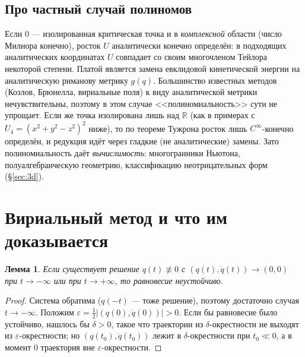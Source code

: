 \documentclass[11pt,a4paper]{article}
\newtheorem{lemma}[theorem]{Лемма}
\theoremstyle{definition}
\newcommand{\R}{\mathbb R}
\newcommand{\eps}{\varepsilon}
\begin{document}
\subsection{Про частный случай полиномов}\label{sec:poly}
Если $0$ --- изолированная критическая точка и в \emph{комплексной} области (число Милнора конечно),
росток $U$ аналитически конечно определён: в подходящих аналитических координатах $U$ совпадает со
своим многочленом Тейлора некоторой степени. Платой является замена евклидовой кинетической энергии
на аналитическую риманову метрику $g(q)$. Большинство известных методов (Козлов, Брюнелла,
вириальные поля) к виду аналитической метрики нечувствительны, поэтому в этом случае
<<полиномиальность>> сути не упрощает. Если же точка изолирована лишь над $\R$ (как в примерах
с $U_4=(x^2+y^2-z^2)^2$ ниже), то по теореме Тужрона росток лишь $C^\infty$-конечно определён,
и редукция идёт через гладкие (не аналитические) замены. Зато полиномиальность даёт
\emph{вычислимость}: многогранники Ньютона, полуалгебраическую геометрию, классификацию
неотрицательных форм (\S\ref{sec:3d}).

\section{Вириальный метод и что им доказывается}\label{sec:virial}

\begin{lemma}\label{lem:asympt}
Если существует решение $q(t)\not\equiv0$ с $(q(t),\dot q(t))\to(0,0)$ при $t\to-\infty$ или при
$t\to+\infty$, то равновесие неустойчиво.
\end{lemma}
\begin{proof}
Система обратима ($q(-t)$ --- тоже решение), поэтому достаточно случая $t\to-\infty$.
Положим $\eps=\frac12|(q(0),\dot q(0))|>0$. Если бы равновесие было устойчиво, нашлось бы $\delta>0$,
такое что траектории из $\delta$-окрестности не выходят из $\eps$-окрестности; но
$(q(t_0),\dot q(t_0))$ лежит в $\delta$-окрестности при $t_0\ll0$, а в момент $0$ траектория вне
$\eps$-окрестности.
\end{proof}
\end{document}
